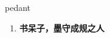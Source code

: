 
\begin{frame}
{\huge pedant}
\begin{center}
\begin{enumerate}\Large
  \item \textbf{书呆子，墨守成规之人}
\end{enumerate}
\end{center}
\end{frame}
